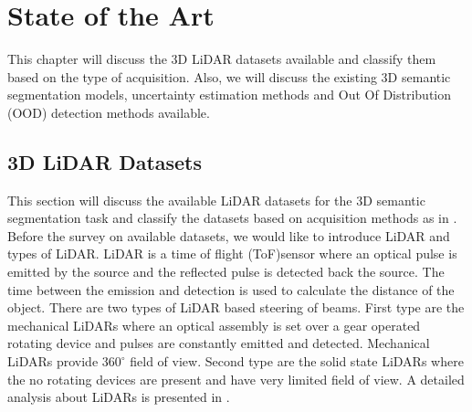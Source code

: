 

    \chapter{State of the Art}
    This chapter will discuss the 3D LiDAR datasets available and classify them based on the type of acquisition.
    Also, we will discuss the existing 3D semantic segmentation models, uncertainty estimation methods and Out Of Distribution (OOD) detection methods available.
    \section{3D LiDAR Datasets}
    This section will discuss the available LiDAR datasets for the 3D semantic segmentation task and classify the datasets based on acquisition methods as in \cite{survey3d}.
    Before the survey on available datasets, we would like to introduce LiDAR and types of LiDAR.
    LiDAR is a time of flight (ToF)sensor where an optical pulse is emitted by the source and the reflected pulse is detected back the source.
    The time between the emission and detection is used to calculate the distance of the object.
    There are two types of LiDAR based steering of beams.
    First type are the mechanical LiDARs where an optical assembly is set over a gear operated rotating device and pulses are constantly emitted and detected.
    Mechanical LiDARs provide $360^{\circ}$ field of view.
    Second type are the solid state LiDARs where the no rotating devices are present and have very limited field of view. 
    A detailed analysis about LiDARs is presented in \cite{lidar}.


